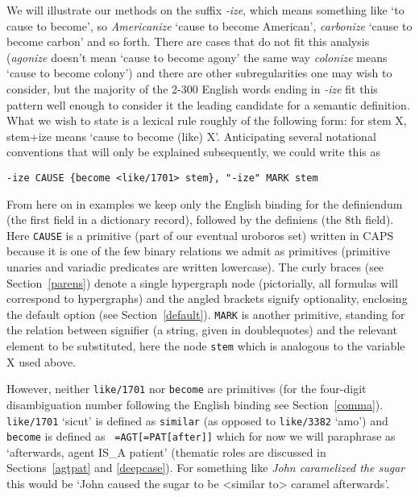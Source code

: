 \documentclass[11pt,bookmarks,bookmarksnumbered,naturalnames,plainpages=false,pdftex,colorlinks=true,urlcolor=blue,bookmarksdepth=subsection,plainpages=false]{paper}
\begin{document}
We will illustrate our methods on the suffix {\it -ize}, which means something
like `to cause to become', so {\it Americanize} `cause to become American',
{\it carbonize} `cause to become carbon' and so forth. There are cases that do
not fit this analysis ({\it agonize} doesn't mean `cause to become agony' the
same way {\it colonize} means `cause to become colony') and there are other
subregularities one may wish to consider, but the majority of the 2-300
English words ending in {\it -ize} fit this pattern well enough to consider it
the leading candidate for a semantic definition. What we wish to state is a
lexical rule roughly of the following form: for stem X, stem+ize means `cause
to become (like) X'. Anticipating several notational conventions that will
only be explained subsequently, we could write this as 

\begin{verbatim}
-ize CAUSE {become <like/1701> stem}, "-ize" MARK stem
\end{verbatim}

\noindent 
From here on in examples we keep only the English binding for the definiendum
(the first field in a dictionary record), followed by the definiens (the 8th
field).  Here {\tt CAUSE} is a primitive (part of our eventual uroboros set)
written in CAPS because it is one of the few binary relations we admit as
primitives (primitive unaries and variadic predicates are written lowercase).
The curly braces (see Section~\ref{parens}) denote a single hypergraph node
(pictorially, all formulas will correspond to hypergraphs) and the angled
brackets signify optionality, enclosing the default option (see
Section~\ref{default}). {\tt MARK} is another primitive, standing for the
relation between signifier (a string, given in doublequotes) and the relevant
element to be substituted, here the node {\tt stem} which is analogous to the
variable X used above.

However, neither {\tt like/1701} nor {\tt become} are primitives (for the
four-digit disambiguation number following the English binding see
Section~\ref{comma}). {\tt like/1701} `sicut' is defined as {\tt similar} (as
opposed to {\tt like/3382} `amo') and {\tt become} is defined as {\tt
  =AGT[=PAT[after]]} which for now we will paraphrase as `afterwards, agent
IS\_A patient' (thematic roles are discussed in Sections~\ref{agtpat} and
\ref{deepcase}). For something like {\it John caramelized the sugar} this 
would be `John caused the sugar to be <similar to> caramel afterwards'. 
\end{document}
